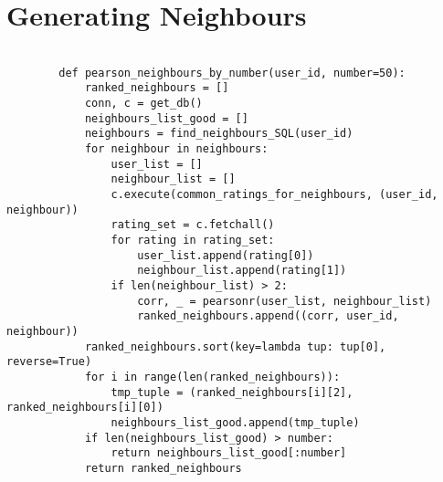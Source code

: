 \documentclass[12pt]{report}
\begin{document}
\lstlistoflistings
    \thispagestyle{empty}



 
   



\appendix
\chapter{Generating Neighbours}

    \begin{lstlisting}[gobble=16,  tabsize=4,caption=Code used to retrieve the neighbours for a user. ,label=fig:FindingNeighboursPearsonMethod]

        def pearson_neighbours_by_number(user_id, number=50):
            ranked_neighbours = []
            conn, c = get_db()
            neighbours_list_good = []
            neighbours = find_neighbours_SQL(user_id)
            for neighbour in neighbours:
                user_list = []
                neighbour_list = []
                c.execute(common_ratings_for_neighbours, (user_id, neighbour))
                rating_set = c.fetchall()
                for rating in rating_set:
                    user_list.append(rating[0])
                    neighbour_list.append(rating[1])
                if len(neighbour_list) > 2:
                    corr, _ = pearsonr(user_list, neighbour_list)
                    ranked_neighbours.append((corr, user_id, neighbour))
            ranked_neighbours.sort(key=lambda tup: tup[0], reverse=True)
            for i in range(len(ranked_neighbours)):
                tmp_tuple = (ranked_neighbours[i][2], ranked_neighbours[i][0])
                neighbours_list_good.append(tmp_tuple)
            if len(neighbours_list_good) > number:
                return neighbours_list_good[:number]
            return ranked_neighbours

    \end{lstlisting}
\end{document}
